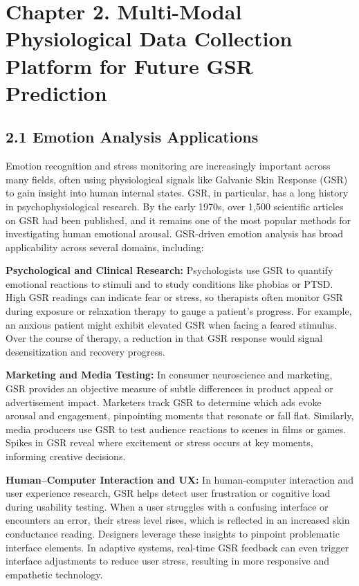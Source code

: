 \label{chap:2}

\chapter{Chapter 2. Multi-Modal Physiological Data Collection Platform for Future GSR Prediction}

\section{2.1 Emotion Analysis Applications}

Emotion recognition and stress monitoring are increasingly important across many fields, often using physiological signals like Galvanic Skin Response (GSR) to gain insight into human internal states. GSR, in particular, has a long history in psychophysiological research. By the early 1970s, over 1,500 scientific articles on GSR had been published, and it remains one of the most popular methods for investigating human emotional arousal\cite{Boucsein2012}. GSR-driven emotion analysis has broad applicability across several domains, including:

\textbf{Psychological and Clinical Research:} Psychologists use GSR to quantify emotional reactions to stimuli and to study conditions like phobias or PTSD. High GSR readings can indicate fear or stress, so therapists often monitor GSR during exposure or relaxation therapy to gauge a patient's progress\cite{AppleHealthWatch2019}\cite{SamsungHealth2020}. For example, an anxious patient might exhibit elevated GSR when facing a feared stimulus. Over the course of therapy, a reduction in that GSR response would signal desensitization and recovery progress.

\textbf{Marketing and Media Testing:} In consumer neuroscience and marketing, GSR provides an objective measure of subtle differences in product appeal or advertisement impact. Marketers track GSR to determine which ads evoke arousal and engagement, pinpointing moments that resonate or fall flat\cite{Fowles1981}\cite{Healey2005}. Similarly, media producers use GSR to test audience reactions to scenes in films or games. Spikes in GSR reveal where excitement or stress occurs at key moments, informing creative decisions.

\textbf{Human–Computer Interaction and UX:} In human-computer interaction and user experience research, GSR helps detect user frustration or cognitive load during usability testing. When a user struggles with a confusing interface or encounters an error, their stress level rises, which is reflected in an increased skin conductance reading\cite{Picard2001}. Designers leverage these insights to pinpoint problematic interface elements. In adaptive systems, real-time GSR feedback can even trigger interface adjustments to reduce user stress, resulting in more responsive and empathetic technology.

